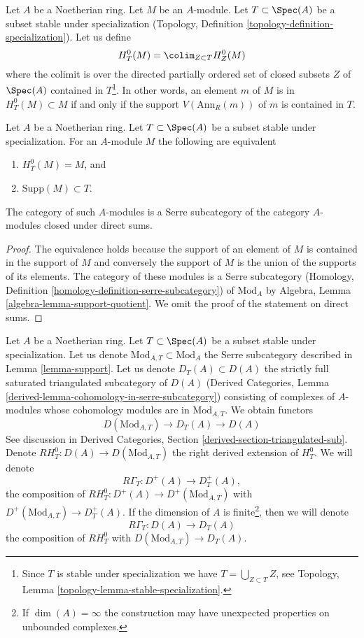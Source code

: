 \noindent
Let $A$ be a Noetherian ring. Let $M$ be an $A$-module.
Let $T \subset \Spec(A)$ be a subset stable under specialization
(Topology, Definition \ref{topology-definition-specialization}).
Let us define
$$
H^0_T(M) = \colim_{Z \subset T} H^0_Z(M)
$$
where the colimit is over the directed partially ordered set of
closed subsets $Z$ of $\Spec(A)$ contained in
$T$\footnote{Since $T$ is stable under specialization
we have $T = \bigcup_{Z \subset T} Z$, see
Topology, Lemma \ref{topology-lemma-stable-specialization}.}.
In other words, an element $m$ of $M$ is in $H^0_T(M) \subset M$
if and only if the support $V(\text{Ann}_R(m))$ of $m$
is contained in $T$.

\begin{lemma}
\label{lemma-support}
Let $A$ be a Noetherian ring. Let $T \subset \Spec(A)$ be a subset stable
under specialization. For an $A$-module $M$ the following are equivalent
\begin{enumerate}
\item $H^0_T(M) = M$, and
\item $\text{Supp}(M) \subset T$.
\end{enumerate}
The category of such $A$-modules is a Serre subcategory
of the category $A$-modules closed under direct sums.
\end{lemma}

\begin{proof}
The equivalence holds because the support of an element of $M$
is contained in the support of $M$ and conversely the support of
$M$ is the union of the supports of its elements.
The category of these modules is a Serre subcategory
(Homology, Definition \ref{homology-definition-serre-subcategory})
of $\text{Mod}_A$ by
Algebra, Lemma \ref{algebra-lemma-support-quotient}.
We omit the proof of the statement on direct sums.
\end{proof}

\noindent
Let $A$ be a Noetherian ring. Let $T \subset \Spec(A)$ be a subset stable
under specialization. Let us denote $\text{Mod}_{A, T} \subset \text{Mod}_A$
the Serre subcategory described in Lemma \ref{lemma-support}.
Let us denote $D_T(A) \subset D(A)$ the
strictly full saturated triangulated subcategory of $D(A)$
(Derived Categories, Lemma \ref{derived-lemma-cohomology-in-serre-subcategory})
consisting of complexes of $A$-modules whose cohomology modules
are in $\text{Mod}_{A, T}$. We obtain functors
$$
D(\text{Mod}_{A, T}) \to D_T(A) \to D(A)
$$
See discussion in
Derived Categories, Section \ref{derived-section-triangulated-sub}.
Denote $RH^0_T : D(A) \to D(\text{Mod}_{A, T})$ the right
derived extension of $H^0_T$. We will denote
$$
R\Gamma_T : D^+(A) \to D^+_T(A),
$$
the composition of $RH^0_T : D^+(A) \to D^+(\text{Mod}_{A, T})$ with
$D^+(\text{Mod}_{A, T}) \to D^+_T(A)$. If the dimension of $A$ is
finite\footnote{If $\dim(A) = \infty$ the construction
may have unexpected properties on unbounded complexes.},
then we will denote
$$
R\Gamma_T : D(A) \to D_T(A)
$$
the composition of $RH^0_T$ with
$D(\text{Mod}_{A, T}) \to D_T(A)$.


